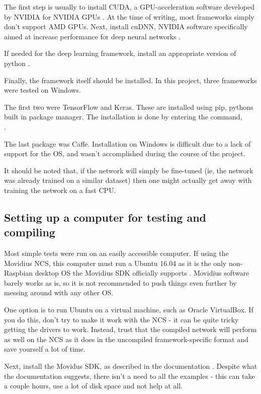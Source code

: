 The first step is usually to install CUDA, a GPU-acceleration software developed by NVIDIA for NVIDIA GPUs \cite{nvidia_cuda}. At the time of writing, most frameworks simply don't support AMD GPUs. Next, install cuDNN, NVIDIA software specifically aimed at increase performance for deep neural networks \cite{nvidia_cudnn}.

If needed for the deep learning framework, install an appropriate version of python \cite{python}.

Finally, the framework itself should be installed. In this project, three frameworks were tested on Windows.

The first two were TensorFlow and Keras. These are installed using pip, pythons built in package manager. The installation is done by entering the command,\\
.

The last package was Caffe. Installation on Windows is difficult due to a lack of support for the OS, and wasn't accomplished during the course of the project.

It should be noted that, if the network will simply be fine-tuned (ie, the network was already trained on a similar dataset) then one might actually get away with training the network on a fast CPU.


\subsection{Setting up a computer for testing and compiling}
Most simple tests were run on an easily accessible computer. If using the Movidius NCS, this computer must run a Ubuntu 16.04 as it is the only non-Raspbian desktop OS the Movidius SDK officially supports \cite{website:movidius_install}. Movidius software barely works as is, so it is not recommended to push things even further by messing around with any other OS.

One option is to run Ubuntu on a virtual machine, such as Oracle VirtualBox. If you do this, don't try to make it work with the NCS - it can be quite tricky getting the drivers to work. Instead, trust that the compiled network will perform as well on the NCS as it does in the uncompiled framework-specific format and save yourself a lot of time.

Next, install the Movidus SDK, as described in the documentation \cite{website:movidius_install}. Despite what the documentation suggests, there isn't a need to  all the examples - this can take a couple hours, use a lot of disk space and not help at all.


